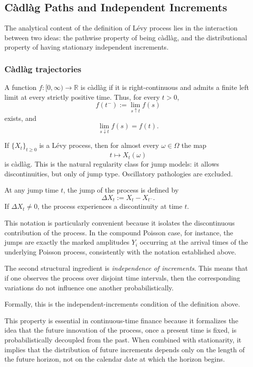\subsection{C\`adl\`ag Paths and Independent Increments}

The analytical content of the definition of L\'evy process lies in the interaction between two ideas: the pathwise property of being c\`adl\`ag, and the distributional property of having stationary independent increments.
\subsubsection{C\`adl\`ag trajectories}

A function $f:[0,\infty)\to\mathbb{R}$ is c\`adl\`ag if it is right-continuous and admits a finite left limit at every strictly positive time. Thus, for every $t>0$,
\[
f(t^-):=\lim_{s\uparrow t}f(s)
\]
exists, and
\[
\lim_{s\downarrow t}f(s)=f(t).
\]

If $\{X_t\}_{t\geq 0}$ is a L\'evy process, then for almost every $\omega\in\Omega$ the map
\[
t\longmapsto X_t(\omega)
\]
is c\`adl\`ag. This is the natural regularity class for jump models: it allows discontinuities, but only of jump type. Oscillatory pathologies are excluded.

At any jump time $t$, the jump of the process is defined by
\begin{equation}
\Delta X_t := X_t - X_{t^-}.
\end{equation}
If $\Delta X_t\neq 0$, the process experiences a discontinuity at time $t$.

\medskip

This notation is particularly convenient because it isolates the discontinuous contribution of the process. In the compound Poisson case, for instance, the jumps are exactly the marked amplitudes $Y_i$ occurring at the arrival times of the underlying Poisson process, consistently with the notation established above.


The second structural ingredient is \emph{independence of increments}. This means that if one observes the process over disjoint time intervals, then the corresponding variations do not influence one another probabilistically.

Formally, this is the independent-increments condition of the definition above.

This property is essential in continuous-time finance because it formalizes the idea that the future innovation of the process, once a present time is fixed, is probabilistically decoupled from the past. When combined with stationarity, it implies that the distribution of future increments depends only on the length of the future horizon, not on the calendar date at which the horizon begins.

